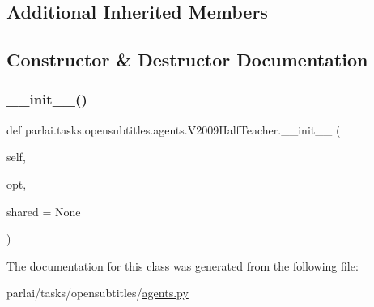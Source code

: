 \subsection*{Additional Inherited Members}


\subsection{Constructor \& Destructor Documentation}
\mbox{\label{classparlai_1_1tasks_1_1opensubtitles_1_1agents_1_1V2009HalfTeacher_a9bc739825e9990d471efa003e92e52d4}} 
\subsubsection{\texorpdfstring{\+\_\+\+\_\+init\+\_\+\+\_\+()}{\_\_init\_\_()}}
{\footnotesize\ttfamily def parlai.\+tasks.\+opensubtitles.\+agents.\+V2009\+Half\+Teacher.\+\_\+\+\_\+init\+\_\+\+\_\+ (\begin{DoxyParamCaption}\item[{}]{self,  }\item[{}]{opt,  }\item[{}]{shared = {\ttfamily None} }\end{DoxyParamCaption})}



The documentation for this class was generated from the following file\+:\begin{DoxyCompactItemize}
\item 
parlai/tasks/opensubtitles/\hyperlink{parlai_2tasks_2opensubtitles_2agents_8py}{agents.\+py}\end{DoxyCompactItemize}
